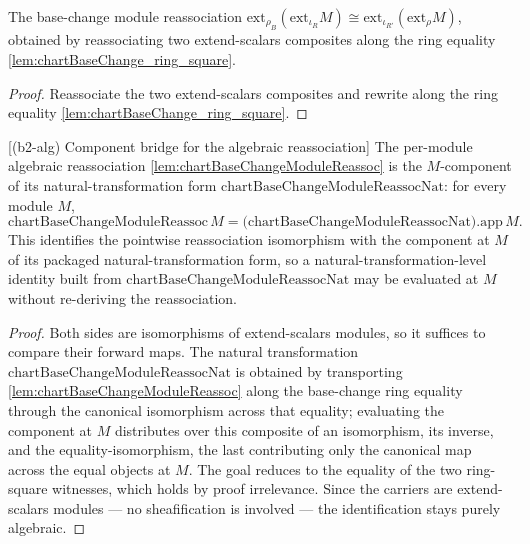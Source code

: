 \begin{lemma}
  \label{lem:chartBaseChangeModuleReassoc}
  The base-change module reassociation
  \(\mathrm{ext}_{\rho_B}(\mathrm{ext}_{\iota_R}M)\cong\mathrm{ext}_{\iota_{R'}}(\mathrm{ext}_{\rho}M)\),
  obtained by reassociating two extend-scalars composites along the ring equality
  \cref{lem:chartBaseChange_ring_square}.
  \begin{proof}
    Reassociate the two extend-scalars composites and rewrite along the ring equality
    \cref{lem:chartBaseChange_ring_square}.
  \end{proof}
\end{lemma}

\begin{lemma}

[(b2-alg) Component bridge for the algebraic reassociation]
  \label{lem:chartBaseChangeModuleReassoc_eq_natApp}
  The per-module algebraic reassociation \cref{lem:chartBaseChangeModuleReassoc} is the \(M\)-component
  of its natural-transformation form \(\mathrm{chartBaseChangeModuleReassocNat}\): for every module
  \(M\),
  \[
    \mathrm{chartBaseChangeModuleReassoc}\,M
      = \bigl(\mathrm{chartBaseChangeModuleReassocNat}\bigr).\mathrm{app}\,M .
  \]
  This identifies the pointwise reassociation isomorphism with the component at \(M\) of its packaged
  natural-transformation form, so a natural-transformation-level identity built from
  \(\mathrm{chartBaseChangeModuleReassocNat}\) may be evaluated at \(M\) without re-deriving the
  reassociation.
  \begin{proof}
    Both sides are isomorphisms of extend-scalars modules, so it suffices to compare their forward
    maps. The natural transformation \(\mathrm{chartBaseChangeModuleReassocNat}\) is obtained by
    transporting \cref{lem:chartBaseChangeModuleReassoc} along the base-change ring equality through
    the canonical isomorphism across that equality; evaluating the component at \(M\) distributes over
    this composite of an isomorphism, its inverse, and the equality-isomorphism, the last contributing
    only the canonical map across the equal objects at \(M\). The goal reduces to the equality of the
    two ring-square witnesses, which holds by proof irrelevance. Since the carriers are extend-scalars
    modules — no sheafification is involved — the identification stays purely algebraic.
  \end{proof}
\end{lemma}

